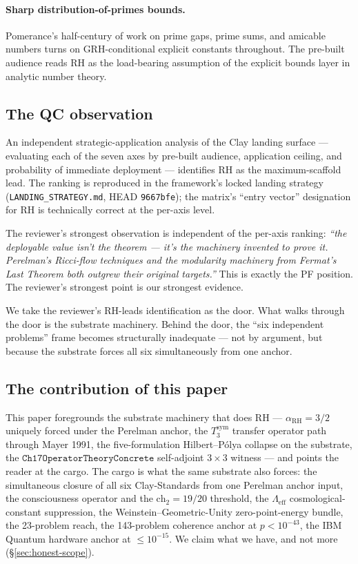 \documentclass[11pt,a4paper]{article}
\theoremstyle{plain}
\theoremstyle{definition}
\begin{document}
\paragraph{Sharp distribution-of-primes bounds.} Pomerance's
half-century of work on prime gaps, prime sums, and amicable numbers
turns on GRH-conditional explicit constants throughout. The pre-built
audience reads RH as the load-bearing assumption of the explicit
bounds layer in analytic number theory.

\subsection{The QC observation}
\label{sec:qc-observation}

An independent strategic-application analysis of the Clay landing
surface --- evaluating each of the seven axes by pre-built audience,
application ceiling, and probability of immediate deployment ---
identifies RH as the maximum-scaffold lead. The ranking is reproduced
in the framework's locked landing strategy
(\texttt{LANDING\_STRATEGY.md}, HEAD \texttt{9667bfe}); the matrix's
``entry vector'' designation for RH is technically correct at the
per-axis level.

The reviewer's strongest observation is independent of the per-axis
ranking: \emph{``the deployable value isn't the theorem --- it's the
machinery invented to prove it. Perelman's Ricci-flow techniques and
the modularity machinery from Fermat's Last Theorem both outgrew their
original targets.''} This is exactly the PF position. The reviewer's
strongest point is our strongest evidence.

We take the reviewer's RH-leads identification as the door. What walks
through the door is the substrate machinery. Behind the door, the
``six independent problems'' frame becomes structurally inadequate ---
not by argument, but because the substrate forces all six simultaneously
from one anchor.

\subsection{The contribution of this paper}
\label{sec:contribution}

This paper foregrounds the substrate machinery that does RH ---
$\alpha_{\mathrm{RH}} = 3/2$ uniquely forced under the Perelman anchor,
the $T_3^{\mathrm{sym}}$ transfer operator path through Mayer 1991, the
five-formulation Hilbert--P\'olya collapse on the substrate, the
$\mathtt{Ch17OperatorTheoryConcrete}$ self-adjoint $3\times 3$ witness
--- and points the reader at the cargo. The cargo is what the same
substrate also forces: the simultaneous closure of all six
Clay-Standards from one Perelman anchor input, the consciousness
operator and the $\mathrm{ch}_2 = 19/20$ threshold, the
$\Lambda_{\mathrm{eff}}$ cosmological-constant suppression, the
Weinstein--Geometric-Unity zero-point-energy bundle, the 23-problem
reach, the 143-problem coherence anchor at $p < 10^{-43}$, the IBM
Quantum hardware anchor at $\le 10^{-15}$. We claim what we have, and
not more (\S\ref{sec:honest-scope}).
\end{document}
